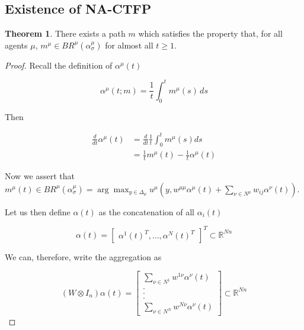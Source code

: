 \documentclass{article}
\theoremstyle{definition}
\newtheorem{theorem}{Theorem}
\begin{document}
\subsection{Existence of NA-CTFP}

  \begin{theorem}
    There exists a path $m$ which satisfies the property that, for all agents $\mu$, $m^\mu \in
    BR^\mu(\alpha_\sigma^\mu)$ for almost all $t \geq 1$.
  \end{theorem}

  \begin{proof}
    Recall the definition of $\alpha^\mu(t)$

    \begin{equation*}
    \alpha^\mu(t; m) = \frac{1}{t} \int_{0}^{t} m^\mu(s) \, ds
    \end{equation*}

    Then 

    \begin{align}
    \frac{d}{dt} \alpha^\mu(t) & = \frac{d}{dt} \frac{1}{t} \int_{0}^t m^\mu(s) ds \nonumber \\
    & = \frac{1}{t} m^\mu(t) - \frac{1}{t} \alpha^\mu(t)
    \end{align}

    Now we assert that $m^\mu(t) \in BR^\mu(\alpha_{\sigma}^\mu) = \arg\max_{y \in \Delta_\mu} u^\mu(y,
    w^{\mu \mu} \alpha^\mu(t) + \sum_{\nu \in N^\mu} w_{ij} \alpha^\nu(t))$. 

    Let us then define $\alpha(t)$ as the concatenation of all $\alpha_i(t)$

    \begin{equation}
      \alpha(t) = \begin{bmatrix}
        \alpha^1(t)^T, \ldots, \alpha^N(t)^T
      \end{bmatrix}^T \subset \mathbb{R}^{Nn}
    \end{equation}


    We can, therefore, write the aggregation as

    \begin{equation}
      (W \otimes I_n) \alpha(t) = \begin{bmatrix}
        \sum_{\nu \in N^1} w^{1 \nu} \alpha^\nu(t) \\
        .\\
        .\\
        .\\
        \sum_{\nu \in N^N} w^{N \nu} \alpha^\nu(t)
      \end{bmatrix} \subset \mathbb{R}^{Nn}
    \end{equation}


\end{proof}
\end{document}
